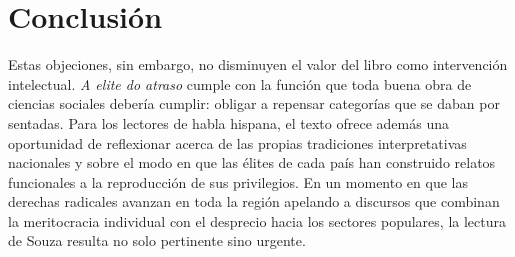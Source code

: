 \documentclass{article}
\begin{document}
\section{Conclusión}
Estas objeciones, sin embargo, no disminuyen el valor del libro como intervención intelectual. \textit{A elite do atraso} cumple con la función que toda buena obra de ciencias sociales debería cumplir: obligar a repensar categorías que se daban por sentadas. Para los lectores de habla hispana, el texto ofrece además una oportunidad de reflexionar acerca de las propias tradiciones interpretativas nacionales y sobre el modo en que las élites de cada país han construido relatos funcionales a la reproducción de sus privilegios. En un momento en que las derechas radicales avanzan en toda la región apelando a discursos que combinan la meritocracia individual con el desprecio hacia los sectores populares, la lectura de Souza resulta no solo pertinente sino urgente.
\end{document}
